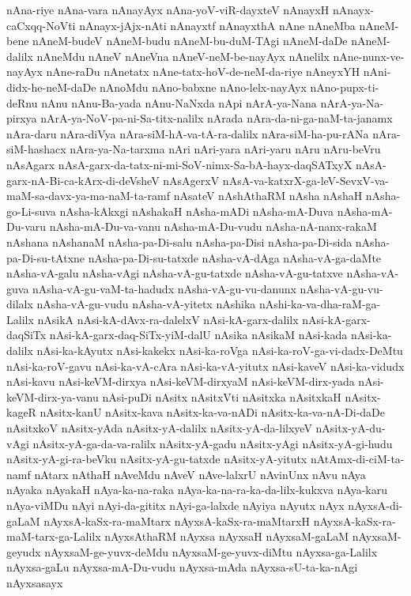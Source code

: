 {nAna-riye
nAna-vara
nAnayAyx
nAna-yoV-viR-dayxteV
nAnayxH
nAnayx-caCxqq-NoVti
nAnayx-jAjx-nAti
nAnayxtf
nAnayxthA
nAne
nAneMba
nAneM-bene
nAneM-budeV
nAneM-budu
nAneM-bu-duM-TAgi
nAneM-daDe
nAneM-dalilx
nAneMdu
nAneV
nAneVna
nAneV-neM-be-nayAyx
nAnelilx
nAne-nunx-ve-nayAyx
nAne-raDu
nAnetatx
nAne-tatx-hoV-de-neM-da-riye
nAneyxYH
nAni-didx-he-neM-daDe
nAnoMdu
nAno-babxne
nAno-lelx-nayAyx
nAno-pupx-ti-deRnu
nAnu
nAnu-Ba-yada
nAnu-NaNxda
nApi
nArA-ya-Nana
nArA-ya-Na-pirxya
nArA-ya-NoV-pa-ni-Sa-titx-nalilx
nArada
nAra-da-ni-ga-naM-ta-janamx
nAra-daru
nAra-diVya
nAra-siM-hA-va-tA-ra-dalilx
nAra-siM-ha-pu-rANa
nAra-siM-hashacx
nAra-ya-Na-tarxma
nAri
nAri-yara
nAri-yaru
nAru
nAru-beVru
nAsAgarx
nAsA-garx-da-tatx-ni-mi-SoV-nimx-Sa-bA-hayx-daqSATxyX
nAsA-garx-nA-Bi-ca-kArx-di-deVsheV
nAsAgerxV
nAsA-va-katxrX-ga-leV-SevxV-va-maM-sa-davx-ya-ma-naM-ta-ramf
nAsateV
nAshAthaRM
nAsha
nAshaH
nAsha-go-Li-suva
nAsha-kAkxgi
nAshakaH
nAsha-mADi
nAsha-mA-Duva
nAsha-mA-Du-varu
nAsha-mA-Du-va-vanu
nAsha-mA-Du-vudu
nAsha-nA-nanx-rakaM
nAshana
nAshanaM
nAsha-pa-Di-salu
nAsha-pa-Disi
nAsha-pa-Di-sida
nAsha-pa-Di-su-tAtxne
nAsha-pa-Di-su-tatxde
nAsha-vA-dAga
nAsha-vA-ga-daMte
nAsha-vA-galu
nAsha-vAgi
nAsha-vA-gu-tatxde
nAsha-vA-gu-tatxve
nAsha-vA-guva
nAsha-vA-gu-vaM-ta-hadudx
nAsha-vA-gu-vu-danunx
nAsha-vA-gu-vu-dilalx
nAsha-vA-gu-vudu
nAsha-vA-yitetx
nAshika
nAshi-ka-va-dha-raM-ga-Lalilx
nAsikA
nAsi-kA-dAvx-ra-dalelxV
nAsi-kA-garx-dalilx
nAsi-kA-garx-daqSiTx
nAsi-kA-garx-daq-SiTx-yiM-dalU
nAsika
nAsikaM
nAsi-kada
nAsi-ka-dalilx
nAsi-ka-kAyutx
nAsi-kakekx
nAsi-ka-roVga
nAsi-ka-roV-ga-vi-dadx-DeMtu
nAsi-ka-roV-gavu
nAsi-ka-vA-cAra
nAsi-ka-vA-yitutx
nAsi-kaveV
nAsi-ka-vidudx
nAsi-kavu
nAsi-keVM-dirxya
nAsi-keVM-dirxyaM
nAsi-keVM-dirx-yada
nAsi-keVM-dirx-ya-vanu
nAsi-puDi
nAsitx
nAsitxVti
nAsitxka
nAsitxkaH
nAsitx-kageR
nAsitx-kanU
nAsitx-kava
nAsitx-ka-va-nADi
nAsitx-ka-va-nA-Di-daDe
nAsitxkoV
nAsitx-yAda
nAsitx-yA-dalilx
nAsitx-yA-da-lilxyeV
nAsitx-yA-du-vAgi
nAsitx-yA-ga-da-va-ralilx
nAsitx-yA-gadu
nAsitx-yAgi
nAsitx-yA-gi-hudu
nAsitx-yA-gi-ra-beVku
nAsitx-yA-gu-tatxde
nAsitx-yA-yitutx
nAtAmx-di-ciM-ta-namf
nAtarx
nAthaH
nAveMdu
nAveV
nAve-lalxrU
nAvinUnx
nAvu
nAya
nAyaka
nAyakaH
nAya-ka-na-raka
nAya-ka-na-ra-ka-da-lilx-kukxva
nAya-karu
nAya-viMDu
nAyi
nAyi-da-gititx
nAyi-ga-lalxde
nAyiya
nAyutx
nAyx
nAyxsA-di-gaLaM
nAyxsA-kaSx-ra-maMtarx
nAyxsA-kaSx-ra-maMtarxH
nAyxsA-kaSx-ra-maM-tarx-ga-Lalilx
nAyxsAthaRM
nAyxsa
nAyxsaH
nAyxsaM-gaLaM
nAyxsaM-geyudx
nAyxsaM-ge-yuvx-deMdu
nAyxsaM-ge-yuvx-diMtu
nAyxsa-ga-Lalilx
nAyxsa-gaLu
nAyxsa-mA-Du-vudu
nAyxsa-mAda
nAyxsa-sU-ta-ka-nAgi
nAyxsasayx
}
